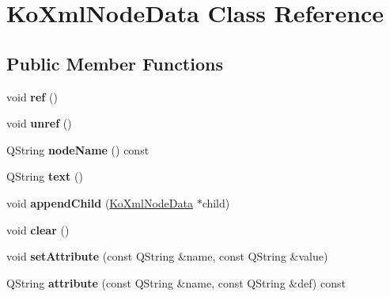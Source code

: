 \hypertarget{classKoXmlNodeData}{
\section{KoXmlNodeData Class Reference}
\label{classKoXmlNodeData}
}
\subsection*{Public Member Functions}
\begin{DoxyCompactItemize}
\item 
\hypertarget{classKoXmlNodeData_ac0cfa5bdb72255a3a14d6bfe6e8924c3}{
void {\bfseries ref} ()}
\label{classKoXmlNodeData_ac0cfa5bdb72255a3a14d6bfe6e8924c3}

\item 
\hypertarget{classKoXmlNodeData_ac9ee8626d48c0f819a03544c1afe51ac}{
void {\bfseries unref} ()}
\label{classKoXmlNodeData_ac9ee8626d48c0f819a03544c1afe51ac}

\item 
\hypertarget{classKoXmlNodeData_abbec8d805bec48bfd13a76e3eae3cfd3}{
QString {\bfseries nodeName} () const }
\label{classKoXmlNodeData_abbec8d805bec48bfd13a76e3eae3cfd3}

\item 
\hypertarget{classKoXmlNodeData_a8ba77663ba3a466396b8cf2f73645311}{
QString {\bfseries text} ()}
\label{classKoXmlNodeData_a8ba77663ba3a466396b8cf2f73645311}

\item 
\hypertarget{classKoXmlNodeData_a7846fe2b5262882a5ee8ae5033cc440d}{
void {\bfseries appendChild} (\hyperlink{classKoXmlNodeData}{KoXmlNodeData} $\ast$child)}
\label{classKoXmlNodeData_a7846fe2b5262882a5ee8ae5033cc440d}

\item 
\hypertarget{classKoXmlNodeData_aa7fd901bd82e4204467c8bde82e2a1ad}{
void {\bfseries clear} ()}
\label{classKoXmlNodeData_aa7fd901bd82e4204467c8bde82e2a1ad}

\item 
\hypertarget{classKoXmlNodeData_af236c56cb539ee7859101c8849f320a2}{
void {\bfseries setAttribute} (const QString \&name, const QString \&value)}
\label{classKoXmlNodeData_af236c56cb539ee7859101c8849f320a2}

\item 
\hypertarget{classKoXmlNodeData_aa5c1fcf499a838138c9e3d7cd84d5b86}{
QString {\bfseries attribute} (const QString \&name, const QString \&def) const }
\label{classKoXmlNodeData_aa5c1fcf499a838138c9e3d7cd84d5b86}


\end{DoxyCompactItemize}
